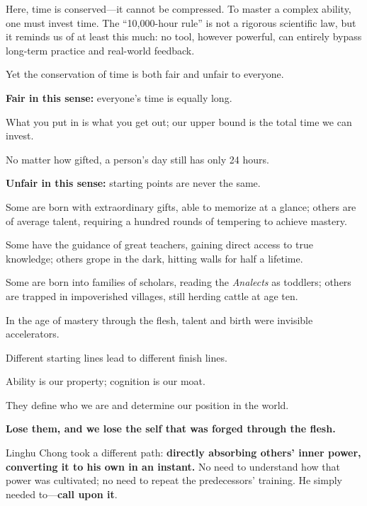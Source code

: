 Here, time is conserved---it cannot be compressed. To master a complex ability, one must invest time. The ``10,000-hour rule'' is not a rigorous scientific law, but it reminds us of at least this much: no tool, however powerful, can entirely bypass long-term practice and real-world feedback.

\begin{importantbox}
    Yet the conservation of time is both fair and unfair to everyone.
\end{importantbox}

\textbf{Fair in this sense:} everyone's time is equally long.

What you put in is what you get out; our upper bound is the total time we can invest.

No matter how gifted, a person's day still has only 24 hours.

\vspace{1em}

\textbf{Unfair in this sense:} starting points are never the same.

Some are born with extraordinary gifts, able to memorize at a glance; others are of average talent, requiring a hundred rounds of tempering to achieve mastery.

Some have the guidance of great teachers, gaining direct access to true knowledge; others grope in the dark, hitting walls for half a lifetime.

Some are born into families of scholars, reading the \textit{Analects} as toddlers; others are trapped in impoverished villages, still herding cattle at age ten.

\vspace{1em}

In the age of mastery through the flesh, talent and birth were invisible accelerators.

Different starting lines lead to different finish lines.

Ability is our property; cognition is our moat.

They define who we are and determine our position in the world.

\textbf{Lose them, and we lose the self that was forged through the flesh.}

\vspace{1em}

Linghu Chong took a different path: \textbf{directly absorbing others' inner power, converting it to his own in an instant.} No need to understand how that power was cultivated; no need to repeat the predecessors' training. He simply needed to---\textbf{call upon it}.

